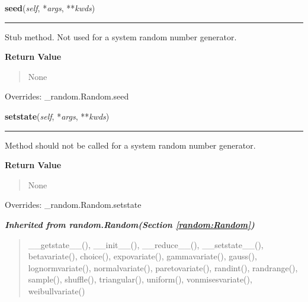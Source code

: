 \hspace{.8\funcindent}\begin{boxedminipage}{\funcwidth}

    \raggedright \textbf{seed}(\textit{self}, *\textit{args}, **\textit{kwds})

    \vspace{-1.5ex}

    \rule{\textwidth}{0.5\fboxrule}
\setlength{\parskip}{2ex}
    Stub method.  Not used for a system random number generator.

\setlength{\parskip}{1ex}
      \textbf{Return Value}
    \vspace{-1ex}

      \begin{quote}
      None

      \end{quote}

      Overrides: \_random.Random.seed

    \end{boxedminipage}

    \vspace{0.5ex}

\hspace{.8\funcindent}\begin{boxedminipage}{\funcwidth}

    \raggedright \textbf{setstate}(\textit{self}, *\textit{args}, **\textit{kwds})

    \vspace{-1.5ex}

    \rule{\textwidth}{0.5\fboxrule}
\setlength{\parskip}{2ex}
    Method should not be called for a system random number generator.

\setlength{\parskip}{1ex}
      \textbf{Return Value}
    \vspace{-1ex}

      \begin{quote}
      None

      \end{quote}

      Overrides: \_random.Random.setstate

    \end{boxedminipage}


\large{\textbf{\textit{Inherited from random.Random\textit{(Section \ref{random:Random})}}}}

\begin{quote}
\_\_getstate\_\_(), \_\_init\_\_(), \_\_reduce\_\_(), \_\_setstate\_\_(), betavariate(), choice(), expovariate(), gammavariate(), gauss(), lognormvariate(), normalvariate(), paretovariate(), randint(), randrange(), sample(), shuffle(), triangular(), uniform(), vonmisesvariate(), weibullvariate()
\end{quote}

